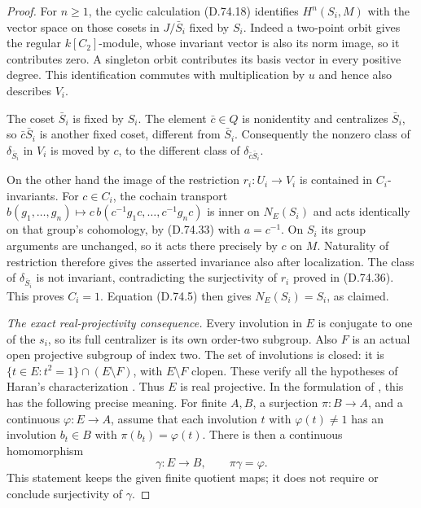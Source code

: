 \begin{proof}
For $n\geq1$, the cyclic calculation (D.74.18)
identifies $H^n(S_i,M)$ with the vector space
on those cosets in $J/\bar S_i$ fixed by $S_i$.
Indeed a two-point orbit gives the regular
$k[C_2]$-module, whose invariant vector is
also its norm image, so it contributes zero.
A singleton orbit contributes its basis vector
in every positive degree.  This identification
commutes with multiplication by $u$ and hence
also describes $V_i$.

The coset $\bar S_i$ is fixed by $S_i$.
The element $\bar c\in Q$ is nonidentity and
centralizes $\bar S_i$, so $\bar c\bar S_i$
is another fixed coset, different from
$\bar S_i$.  Consequently the nonzero class
of $\delta_{\bar S_i}$ in $V_i$ is moved by
$c$, to the different class of
$\delta_{\bar c\bar S_i}$.

On the other hand the image of the restriction
$r_i:U_i\to V_i$ is contained in $C_i$-invariants.
For $c\in C_i$, the cochain transport
$b(g_1,\ldots,g_n)\mapsto
c\,b(c^{-1}g_1c,\ldots,c^{-1}g_nc)$
is inner on $N_E(S_i)$ and acts identically on that
group's cohomology, by (D.74.33) with $a=c^{-1}$.
On $S_i$ its group arguments are unchanged, so it
acts there precisely by $c$ on $M$.
Naturality of restriction
therefore gives the asserted invariance
also after localization.
The class of $\delta_{\bar S_i}$ is not invariant,
contradicting the surjectivity of $r_i$ proved
in (D.74.36).  This proves $C_i=1$.  Equation
(D.74.5) then gives $N_E(S_i)=S_i$, as claimed.

\emph{The exact real-projectivity consequence.}
Every involution in $E$ is conjugate to one of the
$s_i$, so its full centralizer is its own order-two
subgroup.  Also $F$ is an actual open projective
subgroup of index two.  The set of involutions is
closed: it is $\{t\in E:t^2=1\}\cap(E\setminus F)$,
with $E\setminus F$ clopen.  These verify all the
hypotheses of Haran's characterization
\cite[Proposition~2.2]{C-HaranArtinSchreier1993}.
Thus $E$ is real projective.  In the formulation of
\cite[Definition~1.1 and Theorem~2.1]{R-PalQuick2025},
this has the following precise meaning.  For finite
$A,B$, a surjection $\pi:B\to A$, and a continuous
$\varphi:E\to A$, assume that each involution $t$
with $\varphi(t)\ne1$ has an involution $b_t\in B$
with $\pi(b_t)=\varphi(t)$.  There is then a
continuous homomorphism
\[
                 \gamma:E\longrightarrow B,
                         \qquad \pi\gamma=\varphi .
 \tag{D.74.38}
\]
This statement keeps the given finite quotient maps;
it does not require or conclude surjectivity of
$\gamma$.


\end{proof}
